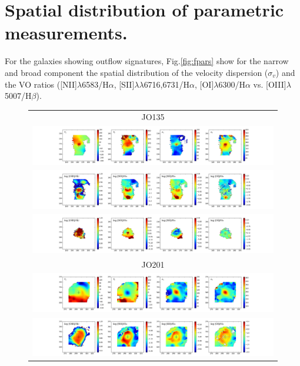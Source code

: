 \documentclass[fleqn,usenatbib]{mnras}
\begin{document}
\section{Spatial distribution of parametric measurements.}
\label{app:map_param}

For the galaxies showing outflow signatures, 
Fig.\ref{fig:fpars} show for the narrow and broad component the  spatial distribution of the velocity dispersion ($\sigma_v$) and the VO ratios ([NII]$\lambda$6583/H$\alpha$, [SII]$\lambda\lambda$6716,6731/H$\alpha$, [OI]$\lambda$6300/H$\alpha$ vs. [OIII]$\lambda$5007/H$\beta$).

\begin{figure}
	\begin{tabular}{c}
		JO135 \\
		\includegraphics[width=1\linewidth]{Plots/JO135_fpars_kin.png}\\		\includegraphics[width=1\linewidth]{Plots/JO135_fpars_n.png}\\
		\includegraphics[width=1\linewidth]{Plots/JO135_fpars_b.png}\\
		JO201 \\
		\includegraphics[width=1\linewidth]{Plots/JO201_fpars_kin.png} \\		\includegraphics[width=1\linewidth]{Plots/JO201_fpars_n.png} \\

\end{tabular}
\end{figure}
\end{document}
